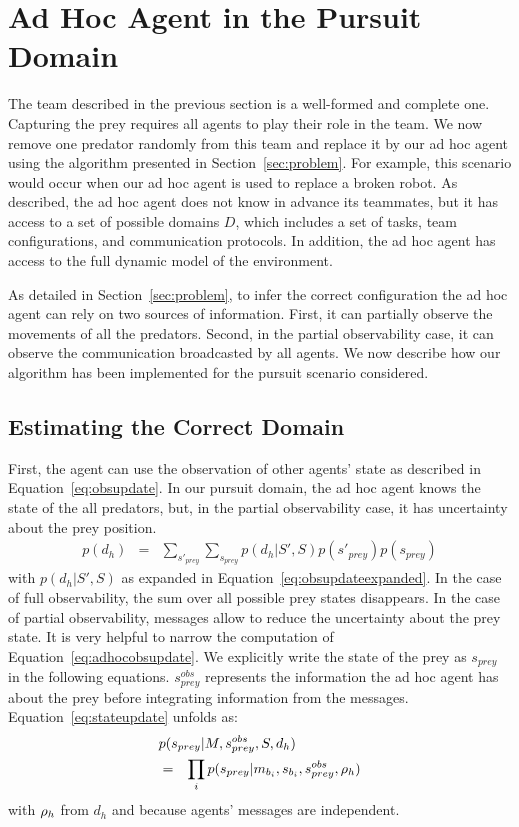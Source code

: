 \section{Ad Hoc Agent in the Pursuit Domain}
\label{sec:method}

The team described in the previous section is a well-formed and complete one. Capturing the prey requires all agents to play their role in the team. We now remove one predator randomly from this team and replace it by our ad hoc agent using the algorithm presented in Section~\ref{sec:problem}. For example, this scenario would occur when our ad hoc agent is used to replace a broken robot. As described, the ad hoc agent does not know in advance its teammates, but it has access to a set of possible domains $D$, which includes a set of tasks, team configurations, and communication protocols. In addition, the ad hoc agent has access to the full dynamic model of the environment.

As detailed in Section~\ref{sec:problem}, to infer the correct configuration the ad hoc agent can rely on two sources of information. First, it can partially observe the movements of all the predators. Second, in the partial observability case, it can observe the communication broadcasted by all agents. We now describe how our algorithm has been implemented for the pursuit scenario considered.

\subsection{Estimating the Correct Domain}

First, the agent can use the observation of other agents' state as described in Equation~\ref{eq:obsupdate}. In our pursuit domain, the ad hoc agent knows the state of the all predators, but, in the partial observability case, it has uncertainty about the prey position.
%
\begin{eqnarray}
p(d_h) &=& \sum_{s'_{prey}} \sum_{s_{prey}} p(d_h|S',S) p(s'_{prey}) p(s_{prey})  \label{eq:adhocobsupdate}
\end{eqnarray}
%
with $p(d_h|S',S)$ as expanded in Equation~\ref{eq:obsupdateexpanded}. In the case of full observability, the sum over all possible prey states disappears. In the case of partial observability, messages allow to reduce the uncertainty about the prey state. It is very helpful to narrow the computation of Equation~\ref{eq:adhocobsupdate}. We explicitly write the state of the prey as $s_{prey}$ in the following equations. $s^{obs}_{prey}$ represents the information the ad hoc agent has about the prey before integrating information from the messages. Equation~\ref{eq:stateupdate} unfolds as:
%
\begin{eqnarray}
\lefteqn{p(s_{prey}|M, s^{obs}_{prey}, S, d_h)} \nonumber \\  &=& \prod_i p(s_{prey}|m_{b_i}, s_{b_i}, s^{obs}_{prey}, \com_h)
\label{eq:preyestimate}
\end{eqnarray}
%
with $\rho_h$ from $d_h$ and because agents' messages are independent.

